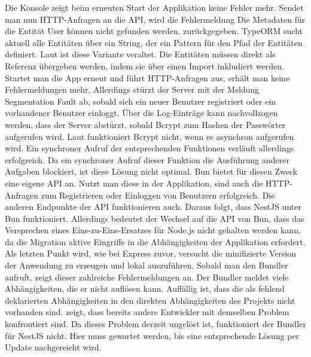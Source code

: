 \noindent
Die Konsole zeigt beim erneuten Start der Applikation keine Fehler mehr. Sendet man nun HTTP-Anfragen an die API, wird die Fehlermeldung \glqq Die Metadaten für die Entität User können nicht gefunden werden.\grqq{} zurückgegeben. TypeORM sucht aktuell alle Entitäten über ein String, der ein Pattern für den Pfad der Entitäten definiert. Laut \cite{TypeORM.2021} ist diese Variante veraltet. Die Entitäten müssen direkt als Referenz übergeben werden, indem sie über einen Import inkludiert werden. \newline
Startet man die App erneut und führt HTTP-Anfragen aus, erhält man keine Fehlermeldungen mehr. Allerdings stürzt der Server mit der Meldung \glqq Segmentation Fault\grqq{} ab, sobald sich ein neuer Benutzer registriert oder ein vorhandener Benutzer einloggt. Über die Log-Einträge kann nachvollzogen werden, dass der Server abstürzt, sobald Bcrypt zum Hashen der Passwörter aufgerufen wird. Laut \cite{Sumner.2023} funktioniert Bcrypt nicht, wenn es asynchron aufgerufen wird. Ein synchroner Aufruf der entsprechenden Funktionen verläuft allerdings erfolgreich. Da ein synchroner Aufruf dieser Funktion die Ausführung anderer Aufgaben blockiert, ist diese Lösung nicht optimal. Bun bietet für diesen Zweck eine eigene API an. Nutzt man diese in der Applikation, sind auch die HTTP-Anfragen zum Registrieren oder Einloggen von Benutzern erfolgreich. Die anderen Endpunkte der API funktionieren auch. Daraus folgt, dass NestJS unter Bun funktioniert. Allerdings bedeutet der Wechsel auf die API von Bun, dass das Versprechen eines Eins-zu-Eins-Ersatzes für Node.js nicht gehalten werden kann, da die Migration aktive Eingriffe in die Abhängigkeiten der Applikation erfordert.\\

\noindent
Als letzten Punkt wird, wie bei Express zuvor, versucht die minifizierte Version der Anwendung zu erzeugen und lokal auszuführen. Sobald man den Bundler aufruft, zeigt dieser zahlreiche Fehlermeldungen an. Der Bundler meldet viele Abhängigkeiten, die er nicht auflösen kann.  Auffällig ist, dass die als fehlend deklarierten Abhängigkeiten in den direkten Abhängigkeiten des Projekts nicht vorhanden sind. \cite{Postek.2023} zeigt, dass bereits andere Entwickler mit demselben Problem konfrontiert sind. Da dieses Problem derzeit ungelöst ist, funktioniert der Bundler für NestJS nicht. Hier muss gewartet werden, bis eine entsprechende Lösung per Update nachgereicht wird.

